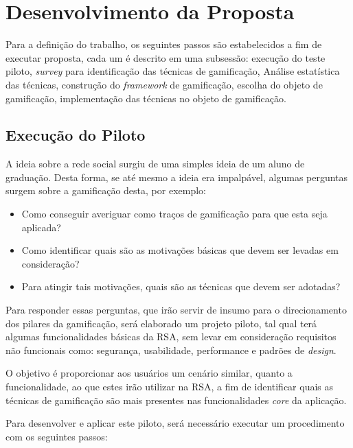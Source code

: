 \chapter[Desenvolvimento da Proposta]{Desenvolvimento da Proposta}

Para a definição do trabalho, os seguintes
passos são estabelecidos a fim de executar proposta, cada um é
descrito em uma subsessão: execução do teste piloto, \textit{survey} para identificação das técnicas de gamificação,
Análise estatística das técnicas, construção do \textit{framework} de gamificação, escolha do objeto de gamificação,
implementação das técnicas no objeto de gamificação.

\section{Execução do Piloto}
\label{sub:execu_o_do_piloto}
A ideia sobre a rede social surgiu de uma simples ideia de um aluno de graduação. Desta forma, se até mesmo a
ideia era impalpável, algumas perguntas surgem sobre a gamificação desta, por exemplo:

\begin{itemize}
    \item Como conseguir averiguar como traços de gamificação para que esta seja aplicada?
    \item Como identificar quais são as motivações básicas que devem ser levadas em consideração?
    \item Para atingir tais motivações, quais são as técnicas que devem ser adotadas?
\end{itemize}

Para responder essas perguntas, que irão servir de insumo para o direcionamento dos pilares da gamificação, será elaborado um projeto piloto, tal qual terá algumas funcionalidades básicas da RSA, sem levar em consideração requisitos não funcionais como: segurança, usabilidade, performance e padrões de \textit{design}.

O objetivo é proporcionar aos usuários um cenário similar, quanto a funcionalidade, ao que estes irão utilizar
na RSA, a fim de identificar quais as técnicas de gamificação são mais presentes nas funcionalidades
\textit{core} da aplicação.

Para desenvolver e aplicar este piloto, será necessário executar um procedimento com os seguintes passos:

